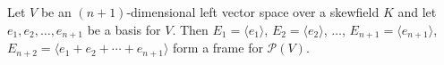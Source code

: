 Let $V$ be an $(n+1)$-dimensional left vector space over a skewfield $K$ and let $e_1, e_2, \dots, e_{n+1}$ be a basis for $V$. Then $E_1 = \langle e_1 \rangle$, $E_2 = \langle e_2 \rangle$, $\dots$, $E_{n+1} = \langle e_{n+1} \rangle$, $E_{n+2} = \langle e_1 + e_2 + \cdots + e_{n+1} \rangle$ form a frame for $\mathcal{P}(V)$.
